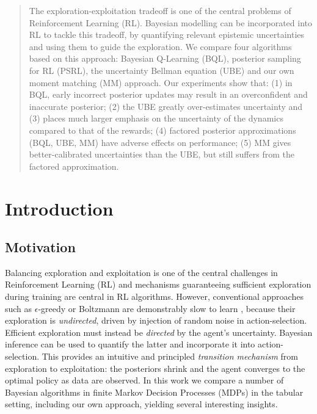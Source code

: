 \documentclass{article}
\begin{document}
\begin{abstract}
The exploration-exploitation tradeoff is one of the central problems of Reinforcement Learning (RL). Bayesian modelling can be incorporated into RL to tackle this tradeoff, by quantifying relevant epistemic uncertainties and using them to guide the exploration. We compare four algorithms based on this approach: Bayesian Q-Learning (BQL), posterior sampling for RL (PSRL), the uncertainty Bellman equation (UBE) and our own moment matching (MM) approach. Our experiments show that: (1) in BQL, early incorrect posterior updates may result in an overconfident and inaccurate posterior; (2) the UBE greatly over-estimates uncertainty and (3) places much larger emphasis on the uncertainty of the dynamics compared to that of the rewards; (4) factored posterior approximations (BQL, UBE, MM) have adverse effects on performance; (5) MM gives better-calibrated uncertainties than the UBE, but still suffers from the factored approximation.
\end{abstract}

\section{Introduction}

\subsection{Motivation}
Balancing exploration and exploitation is one of the central challenges in Reinforcement Learning (RL) \citep{suttonbarto} and mechanisms guaranteeing sufficient exploration during training are central in RL algorithms. However, conventional approaches such as $\epsilon$-greedy or Boltzmann are demonstrably slow to learn \citep{iothesis}, because their exploration is \textit{undirected}, driven by injection of random noise in action-selection. Efficient exploration must instead be \textit{directed} by the agent's uncertainty. Bayesian inference can be used to quantify the latter and incorporate it into action-selection. This provides an intuitive and principled \textit{transition mechanism} from exploration to exploitation: the posteriors shrink and the agent converges to the optimal policy as data are observed. In this work we compare a number of Bayesian algorithms in finite Markov Decision Processes (MDPs) in the tabular setting, including our own approach, yielding several interesting insights.
\end{document}
